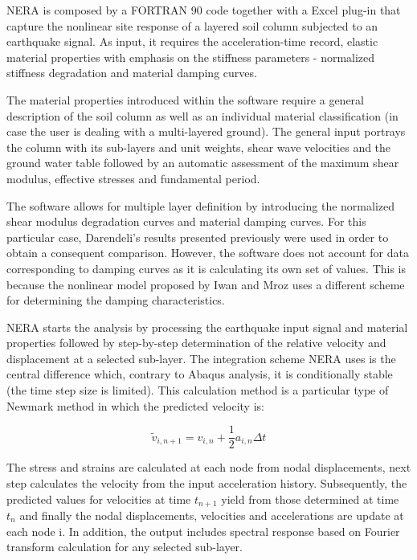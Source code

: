 	NERA is composed by a FORTRAN 90 code together with a Excel plug-in that capture the nonlinear site response of a layered soil column subjected to an earthquake signal. As input, it requires the acceleration-time record, elastic material properties with emphasis on the stiffness parameters - normalized stiffness degradation and material damping curves. 
	
	The material properties introduced within the software require a general description of the soil column as well as an individual material classification (in case the user is dealing with a multi-layered ground). The general input portrays the column with its sub-layers and unit weights, shear wave velocities and the ground water table followed by an automatic assessment of the maximum shear modulus, effective stresses and fundamental period. 
	
	The software allows for multiple layer definition by introducing the normalized shear modulus degradation curves and material damping curves. For this particular case, Darendeli's results presented previously were used in order to obtain a consequent comparison. However, the software does not account for data corresponding to damping curves as it is calculating its own set of values. This is because the nonlinear model proposed by Iwan and Mroz uses a different scheme for determining the damping characteristics.
	
	NERA starts the analysis by processing the earthquake input signal and material properties followed by step-by-step determination of the relative velocity and displacement at a selected sub-layer. The integration scheme NERA uses is the central difference which, contrary to Abaqus analysis, it is conditionally stable (the time step size is limited). This calculation method is a particular type of Newmark method in which the predicted velocity is:
	
	\begin{equation}
	\tilde{v}_{i,n+1}=v_{i,n}+\frac{1}{2}a_{i,n}\Delta t
	\end{equation}
	
	The stress and strains are calculated at each node from nodal displacements, next step calculates the velocity from the input acceleration history. Subsequently, the predicted values for velocities at time $t_{n+1}$ yield from those determined at time $t_n$ and finally the nodal displacements, velocities and accelerations are update at each node i. In addition, the output includes spectral response based on Fourier transform calculation for any selected sub-layer.
	
